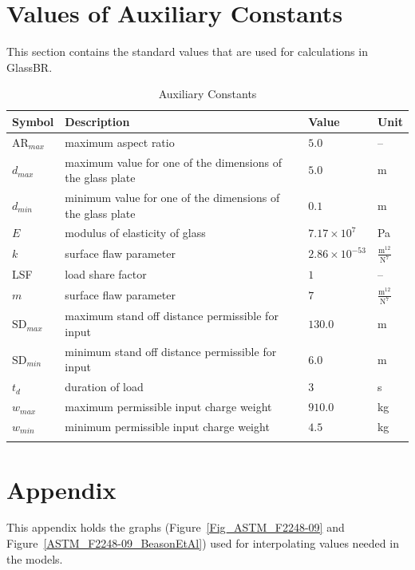 \documentclass[12pt]{article}
\newcommand{\progname}{GlassBR}
\begin{document}
\section{Values of Auxiliary Constants}
\label{Sec:ValuofAuxiCons}
This section contains the standard values that are used for calculations in
\progname{}.

\begin{longtabu}{l X[l] l l}
\toprule
Symbol & Description & Value & Unit
\\
\midrule
${\text{AR}_{max}}$ & maximum aspect ratio & $5.0$ & --
\\
${d_{max}}$ & maximum value for one of the dimensions of the glass plate & $5.0$ & m
\\
${d_{min}}$ & minimum value for one of the dimensions of the glass plate & $0.1$ & m
\\
$E$ & modulus of elasticity of glass & $7.17\times 10^{7}$ & Pa
\\
$k$ & surface flaw parameter & $2.86\times 10^{-53}$ & $\frac{\text{m}^{12}}{\text{N}^{7}}$
\\
LSF & load share factor & $1$ & --
\\
$m$ & surface flaw parameter & $7$ & $\frac{\text{m}^{12}}{\text{N}^{7}}$
\\
${\text{SD}_{max}}$ & maximum stand off distance permissible for input & $130.0$ & m
\\
${\text{SD}_{min}}$ & minimum stand off distance permissible for input & $6.0$ & m
\\
${t_{d}}$ & duration of load & $3$ & s
\\
${w_{max}}$ & maximum permissible input charge weight & $910.0$ & kg
\\
${w_{min}}$ & minimum permissible input charge weight & $4.5$ & kg
\\
\bottomrule
\caption{Auxiliary Constants}
\label{Table:AuxiCons}
\end{longtabu}




\section{Appendix}

This appendix holds the graphs (Figure~\ref{Fig_ASTM_F2248-09} and
Figure~\ref{ASTM_F2248-09_BeasonEtAl}) used for interpolating values needed in
the models.
\end{document}
